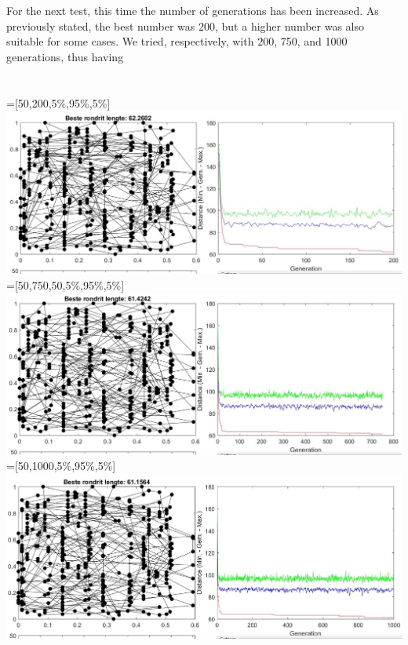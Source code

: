 For the next test, this time the number of generations has been
increased. As previously stated, the best number was 200, but a higher number
was also suitable for some cases. We tried, respectively, with 200, 750, and
1000 generations, thus having\\
\\
\\
 =[50,200,5\%,95\%,5\%]\\
\includegraphics[width=\textwidth]{img/specific/xalt_edges/general_3.jpg}\\
 =[50,750,50,5\%,95\%,5\%] \\
\includegraphics[width=\textwidth]{img/specific/xalt_edges/general_4.jpg}\\
 =[50,1000,5\%,95\%,5\%]\\
\includegraphics[width=\textwidth]{img/specific/xalt_edges/general_5.jpg}\\
\\

